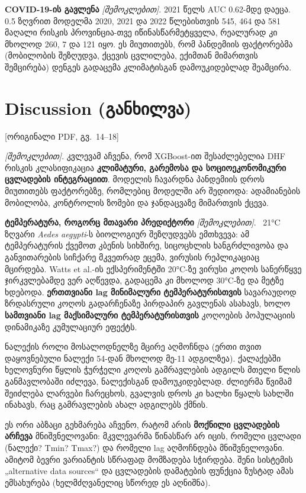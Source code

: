 \documentclass[11pt,a4paper]{article}
\newcommand{\imp}[1]{\textbf{\color{importred}#1}}
\newcommand{\pg}[1]{{\small\color{gray}[ორიგინალი PDF, გვ.~#1]}}
\begin{document}
\textbf{COVID-19-ის გავლენა} \textit{[შემოკლებით]}. 2021 წელს AUC 0.62-მდე დაეცა. 0.5 ზღვრით მოდელმა
2020, 2021 და 2022 წლებისთვის 545, 464 და 581 მაღალი რისკის პროვინცია-თვე იწინასწარმეტყველა,
რეალურად კი მხოლოდ 260, 7 და 121 იყო. ეს მიუთითებს, რომ პანდემიის ფაქტორებმა (მობილობის შეზღუდვა,
ქცევის ცვლილება, ექიმთან მიმართვის შემცირება) დენგეს გადაცემა კლიმატისგან დამოუკიდებლად შეამცირა.

\section{Discussion (განხილვა)} \pg{14--18}

\textit{[შემოკლებით]}. კვლევამ აჩვენა, რომ XGBoost-ით შესაძლებელია DHF რისკის კლასიფიკაცია
\imp{კლიმატური, გარემოსა და სოციოეკონომიკური ცვლადების ინტეგრაციით}. მოდელის ჩავარდნა პანდემიის დროს
მიუთითებს ფაქტორებზე, რომლებიც მოდელში არ შედიოდა: ადამიანების მობილობა, კონტროლის ზომები და
ჯანდაცვაზე მიმართვის ქცევა.

\textbf{ტემპერატურა, როგორც მთავარი პრედიქტორი} \textit{[შემოკლებით]}. ~21°C ზღვარი
\textit{Aedes aegypti}-ს ბიოლოგიურ შეზღუდვებს ემთხვევა: ამ ტემპერატურის ქვემოთ კბენის სიხშირე, სიცოცხლის
ხანგრძლივობა და განვითარების სიჩქარე მკვეთრად ეცემა, ვირუსის რეპლიკაციაც მცირდება. Watts et al.-ის ექსპერიმენტში
20°C-ზე ვირუსი კოღოს სანერწყვე ჯირკვლებამდე ვერ აღწევდა, გადაცემა კი მხოლოდ 30°C-ზე და მეტზე ხდებოდა.
\imp{ერთთვიანი lag მინიმალური ტემპერატურისთვის} სავარაუდოდ ზრდასრული კოღოს გადარჩენაზე პირდაპირ გავლენას ასახავს,
ხოლო \imp{სამთვიანი lag მაქსიმალური ტემპერატურისთვის} კოღოების პოპულაციის დინამიკაზე კუმულაციურ ეფექტს.

ნალექის როლი მოსალოდნელზე მცირე აღმოჩნდა (ერთი თვით დაყოვნებული ნალექი 54-დან მხოლოდ მე-11 ადგილზეა).
ქალაქებში ხელოვნური წყლის ჭურჭელი კოღოს გამრავლების ადგილს მთელი წლის განმავლობაში იძლევა, ნალექისგან
დამოუკიდებლად. ძლიერმა წვიმამ შეიძლება ლარვები ჩარეცხოს, გვალვის დროს კი ხალხი წყალს სახლში ინახავს,
რაც გამრავლების ახალ ადგილებს ქმნის.

\begin{etl}
ეს ორი აბზაცი გეხმარება აჩვენო, რატომ არის \textbf{მოქნილი ცვლადების არჩევა} მნიშვნელოვანი: მკვლევარმა
წინასწარ არ იცის, რომელი ცვლადი (ნალექი? Tmin? Tmax?) და რომელი lag აღმოჩნდება მნიშვნელოვანი. ამიტომ ბევრი
ვარიანტის სწრაფად მომზადება სჭირდება. შენი სისტემის „alternative data sources“ და ცვლადების
დამატების ფუნქცია ზუსტად ამას ემსახურება (ხელმძღვანელიც სწორედ ეს აღნიშნა).
\end{etl}
\end{document}
